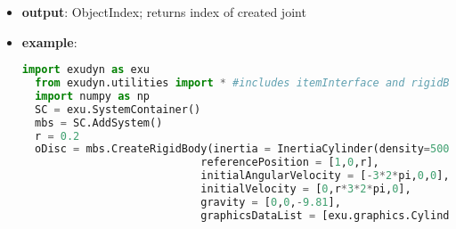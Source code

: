 \begin{itemize}[leftmargin=0.7cm]
\begin{itemize}[leftmargin=1.2cm]
\item[]{\it dryFriction}: 2D list of friction parameters; dry friction coefficients in local wheel coordinates, where for dryFrictionAngle=0, the first parameter refers to forward direction and the second parameter to lateral direction
\item[]{\it viscousFriction}: 2D list of viscous friction coefficients [SI:1/(m/s)] in local wheel coordinates; proportional to slipping velocity, leading to increasing slipping friction force for increasing slipping velocity; directions are same as in dryFriction
\item[]{\it dryFrictionProportionalZone}: limit velocity [m/s] up to which the friction is proportional to velocity (for regularization / avoid numerical oscillations)
\item[]{\it rollingFrictionViscous}: rolling friction [SI:1], which acts against the velocity of the trail on ground and leads to a force proportional to the contact normal force;
\item[]{\it useLinearProportionalZone}: if True, a linear proportional zone is used; the linear zone performs better in implicit time integration as the Jacobian has a constant tangent in the sticking case
\item[]{\it activeConnector}: flag to activate or deactivate the connector
\item[]{\it show}: if True, connector visualization is drawn
\item[]{\it discWidth}: disc with, only used for drawing
\item[]{\it color}: color of connector
\end{itemize}
\item[--]
{\bf output}: ObjectIndex; returns index of created joint
\item[--]
{\bf example}: \vspace{-12pt}\ei\begin{lstlisting}[language=Python, xleftmargin=36pt]
  import exudyn as exu
  from exudyn.utilities import * #includes itemInterface and rigidBodyUtilities
  import numpy as np
  SC = exu.SystemContainer()
  mbs = SC.AddSystem()
  r = 0.2
  oDisc = mbs.CreateRigidBody(inertia = InertiaCylinder(density=5000, length=0.1, outerRadius=r, axis=0),
                            referencePosition = [1,0,r],
                            initialAngularVelocity = [-3*2*pi,0,0],
                            initialVelocity = [0,r*3*2*pi,0],
                            gravity = [0,0,-9.81],
                            graphicsDataList = [exu.graphics.Cylinder(pAxis = [-0.05,0,0], vAxis = [0.1,0,0], radius = r*0.99,

\end{lstlisting}
\end{itemize}
